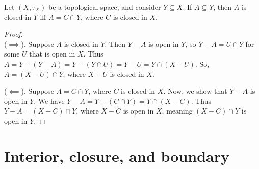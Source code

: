 \begin{theorem}
    Let $(X, \tau_X)$ be a topological space, and consider $Y \subseteq X$. If $A \subseteq Y$, then $A$ is closed in $Y$ iff $A = C \cap Y$, where $C$ is closed in $X$. 
\end{theorem}

\begin{proof}
    \mbox{} \\
    
    \indent ($\implies$). Suppose $A$ is closed in $Y$. Then $Y - A$ is open in $Y$, so $Y - A = U \cap Y$ for some $U$ that is open in $X$. Thus $A = Y - (Y - A) = Y - (Y \cap U) = Y - U = Y \cap (X - U)$. So, $A = (X - U) \cap Y$, where $X - U$ is closed in $X$.
    
    ($\impliedby$). Suppose $A = C \cap Y$, where $C$ is closed in $X$. Now, we show that $Y - A$ is open in $Y$. We have $Y - A = Y - (C \cap Y) = Y \cap (X - C)$. Thus $Y - A = (X - C) \cap Y$, where $X - C$ is open in $X$, meaning $(X - C) \cap Y$ is open in $Y$.
\end{proof}




\newpage

\section*{Interior, closure, and boundary}
\label{ch::topology::section::int_cl_bdy}

